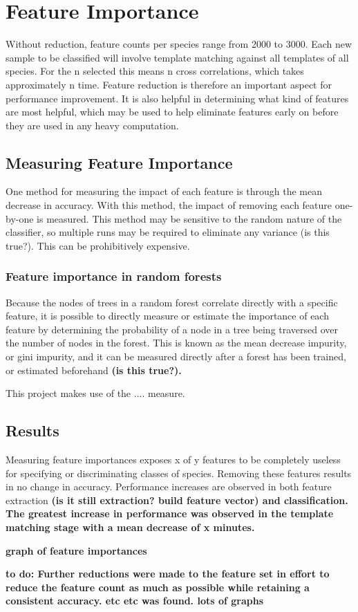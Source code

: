 \section{Feature Importance}
Without reduction, feature counts per species range from 2000 to 3000.
Each new sample to be classified will involve template matching against all
templates of all species.
For the n selected this means n cross correlations, which takes approximately
n time.
Feature reduction is therefore an important aspect for performance improvement.
It is also helpful in determining what kind of features are most helpful, which
may be used to help eliminate features early on before they are used in any
heavy computation.

\subsection{Measuring Feature Importance}
One method for measuring the impact of each feature is through the mean decrease
in accuracy.
With this method, the impact of removing each feature one-by-one is measured.
This method may be sensitive to the random nature of the classifier, so multiple
runs may be required to eliminate any variance (is this true?).
This can be prohibitively expensive.

\subsubsection{Feature importance in random forests}
Because the nodes of trees in a random forest correlate directly with a specific
feature, it is possible to directly measure or estimate the importance of each
feature by determining the probability of a node in a tree being traversed over 
the number of nodes in the forest.
This is known as the mean decrease impurity, or gini impurity, and it can be
measured directly after a forest has been trained, or estimated beforehand \bfseries{(is this true?)}.

This project makes use of the .... measure.

\subsection{Results}
Measuring feature importances exposes x of y features to be completely useless
for specifying or discriminating classes of species.
Removing these features results in no change in accuracy.
Performance increases are observed in both feature extraction
\bfseries{(is it still extraction? build feature vector)} and classification.
The greatest increase in performance was observed in the template matching stage
with a mean decrease of x minutes.

\bfseries{graph of feature importances}

\bfseries{to do:}
Further reductions were made to the feature set in effort to reduce the feature
count as much as possible while retaining a consistent accuracy.
etc etc was found.
lots of graphs

